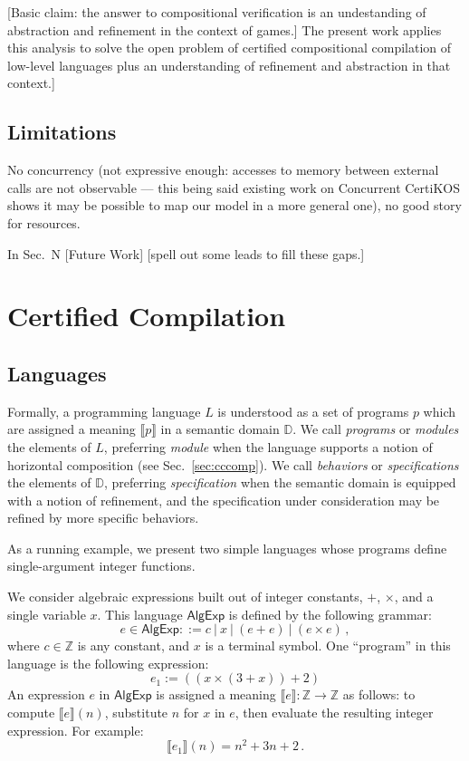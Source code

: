 \documentclass[sigplan,10pt,review,anonymous]{acmart}
\newcommand{\kw}[1]{\ensuremath{ \textsf{#1} }}
\begin{document}
[Basic claim: the answer to compositional verification
is an undestanding of abstraction and refinement in the context of games.]
The present work applies this analysis to
solve the open problem of certified compositional compilation of low-level languages
plus an understanding of refinement and abstraction in that context.]


\subsection{Limitations} %

No concurrency
(not expressive enough:
accesses to memory between external calls are not observable
--- this being said existing work on Concurrent CertiKOS shows
it may be possible to map our model in a more general one),
no good story for resources.

In Sec.~N [Future Work] [spell out some leads to fill these gaps.]



\section{Certified Compilation} %

\subsection{Languages} %

Formally,
a programming language $L$ is understood as
a set of programs $p$
which are assigned a meaning $\llbracket p \rrbracket$
in a semantic domain $\mathbb{D}$.
We call \emph{programs} or \emph{modules} the elements of $L$,
preferring \emph{module} when
the language supports
a notion of horizontal composition (see Sec.~\ref{sec:cccomp}).
We call \emph{behaviors} or \emph{specifications}
the elements of $\mathbb{D}$,
preferring \emph{specification} when
the semantic domain is equipped with
a notion of refinement,
and the specification under consideration
may be refined by more specific behaviors.

As a running example,
we present two simple languages
whose programs define single-argument integer functions.

\begin{example}[$\kw{AlgExp}$] %
We consider algebraic expressions
built out of integer constants, $+$, $\times$,
and a single variable $x$.
This language $\kw{AlgExp}$ is defined by the following grammar:
\[
  e \in \kw{AlgExp} ::= c \:|\: x \:|\: (e + e) \:|\: (e \times e) \,,
\]
where $c \in \mathbb{Z}$ is any constant,
and $x$ is a terminal symbol.
One ``program'' in this language is the following expression:
\[
  e_1 := ((x \times (3 + x)) + 2)
\]
An expression $e$ in \kw{AlgExp} is assigned a meaning
$\llbracket e \rrbracket : \mathbb{Z} \rightarrow \mathbb{Z}$
as follows:
to compute $\llbracket e \rrbracket(n)$,
substitute $n$ for $x$ in $e$,
then evaluate the resulting integer expression.
For example:
\[
  \llbracket e_1 \rrbracket (n) = n^2 + 3n + 2 \,.
\]
\end{example}
\end{document}
